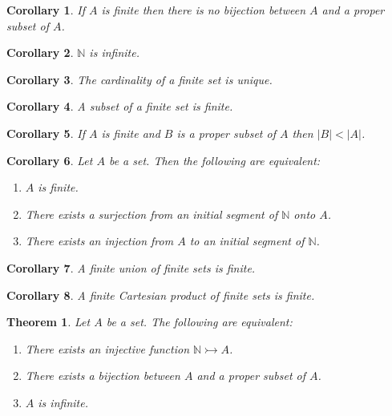 \documentclass{book}
\newtheorem{cor}{Corollary}[ax]
\newtheorem{thm}[ax]{Theorem}
\theoremstyle{definition}
\begin{document}
\begin{cor}
\label{cor:Dedekind_infinite}
If $A$ is finite then there is no bijection between $A$ and a proper subset of $A$.
\end{cor}

\begin{cor}
$\mathbb{N}$ is infinite.
\end{cor}

\begin{cor}
The cardinality of a finite set is unique.
\end{cor}

\begin{cor}
A subset of a finite set is finite.
\end{cor}

\begin{cor}
If $A$ is finite and $B$ is a proper subset of $A$ then $|B| < |A|$.
\end{cor}

\begin{cor}
Let $A$ be a set. Then the following are equivalent:
\begin{enumerate}
\item $A$ is finite.
\item There exists a surjection from an initial segment of $\mathbb{N}$ onto $A$.
\item There exists an injection from $A$ to an initial segment of $\mathbb{N}$.
\end{enumerate}
\end{cor}

\begin{cor}
A finite union of finite sets is finite.
\end{cor}

\begin{cor}
A finite Cartesian product of finite sets is finite.
\end{cor}

\begin{thm}
Let $A$ be a set. The following are equivalent:
\begin{enumerate}
\item There exists an injective function $\mathbb{N} \rightarrowtail A$.
\item There exists a bijection between $A$ and a proper subset of $A$.
\item $A$ is infinite.
\end{enumerate}
\end{thm}
\end{document}
